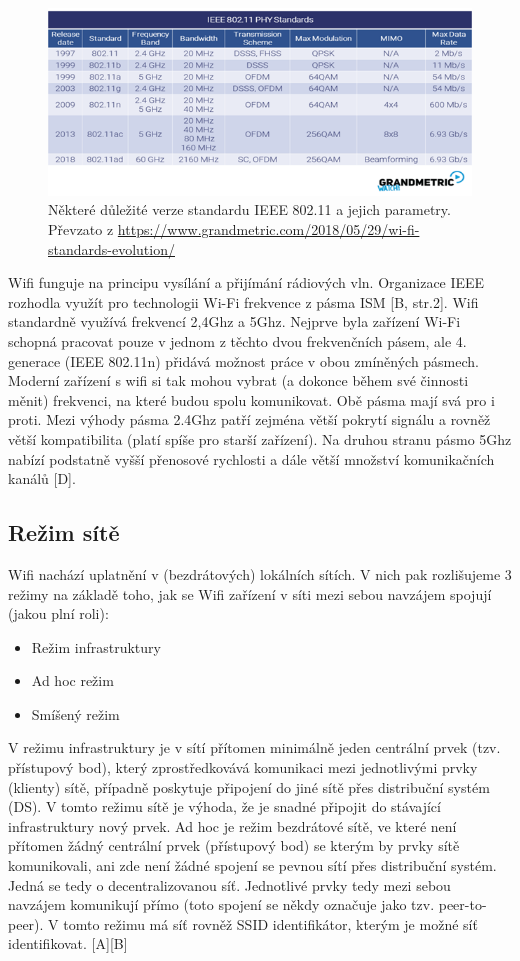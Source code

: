 \begin{figure}[hbt]
	\centering
	\includegraphics{obrazky/wifi-standards.png}
	\caption{Některé důležité verze standardu IEEE 802.11 a jejich parametry. Převzato z \url{https://www.grandmetric.com/2018/05/29/wi-fi-standards-evolution/}}
	\label{wifi-standards}
\end{figure}
Wifi funguje na principu vysílání a přijímání rádiových vln. Organizace IEEE rozhodla využít pro technologii Wi-Fi frekvence z pásma ISM [B, str.2]. Wifi standardně využívá frekvencí 2,4Ghz a 5Ghz. Nejprve byla zařízení Wi-Fi schopná pracovat pouze v jednom z těchto dvou frekvenčních pásem, ale 4. generace (IEEE 802.11n) přidává možnost práce v obou zmíněných pásmech. Moderní zařízení s wifi si tak mohou vybrat (a dokonce během své činnosti měnit) frekvenci, na které budou spolu komunikovat.
Obě pásma mají svá pro i proti. Mezi výhody pásma 2.4Ghz patří zejména větší pokrytí signálu a rovněž větší kompatibilita (platí spíše pro starší zařízení). Na druhou stranu pásmo 5Ghz nabízí podstatně vyšší přenosové rychlosti a dále větší množství komunikačních kanálů [D].

\subsection*{Režim sítě}
Wifi nachází uplatnění v (bezdrátových) lokálních sítích. V nich pak rozlišujeme 3 režimy na základě toho, jak se Wifi zařízení v síti mezi sebou navzájem spojují (jakou plní roli):
\begin{itemize}
    \item Režim infrastruktury
    \item Ad hoc režim
    \item Smíšený režim
\end{itemize}
V režimu infrastruktury je v sítí přítomen minimálně jeden centrální prvek (tzv. přístupový bod), který zprostředkovává komunikaci mezi jednotlivými prvky (klienty) sítě, případně poskytuje připojení do jiné sítě přes distribuční systém (DS). V tomto režimu sítě je výhoda, že je snadné připojit do stávající infrastruktury nový prvek. \newline
Ad hoc je režim bezdrátové sítě, ve které není přítomen žádný centrální prvek (přístupový bod) se kterým by prvky sítě komunikovali, ani zde není žádné spojení se pevnou sítí přes distribuční systém. Jedná se tedy o decentralizovanou síť. Jednotlivé prvky tedy mezi sebou navzájem komunikují přímo (toto spojení se někdy označuje jako tzv. peer-to-peer). V tomto režimu má síť rovněž SSID identifikátor, kterým je možné síť identifikovat. [A][B] \newline


